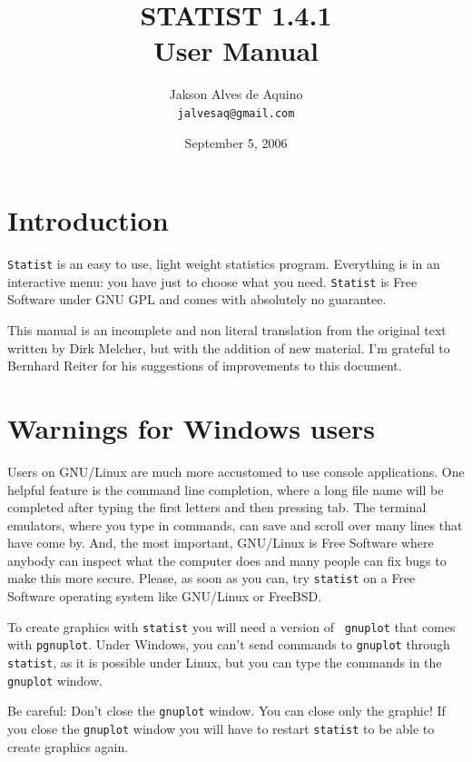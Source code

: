 \documentclass[12pt,english]{article}
\newcommand{\st}{{\tt sta\-tist} }
\begin{document}
\title{STATIST 1.4.1\\User Manual}
\author{Jakson Alves de Aquino\\
{\small {\tt jalvesaq@gmail.com}}}
\date{September 5, 2006}

\maketitle

\tableofcontents
 
\section{Introduction}

{\tt Statist} is an easy to use, light weight statistics
program.  Everything is in an interactive menu: you have
just to choose what you need. {\tt Statist} is Free Software
under GNU GPL and comes with absolutely no guarantee. 

This manual is an incomplete and non literal translation
from the original text written by Dirk Melcher, but with the
addition of new material. I'm grateful to Bernhard Reiter
for his suggestions of improvements to this document.

\section{Warnings for Windows users}

Users on GNU/Linux are much more accustomed to use console
applications.  One helpful feature is the command line
completion, where a long file name will be completed after
typing the first letters and then pressing tab.  The
terminal emulators, where you type in commands, can save and
scroll over many lines that have come by.  And, the most
important, GNU/Linux is Free Software where anybody can
inspect what the computer does and many people can fix bugs
to make this more secure.  Please, as soon as you can, try
\st on a Free Software operating system like GNU/Linux or
FreeBSD.

To create graphics with \st you will need a version of {\tt
gnuplot} that comes with {\tt pgnuplot}. Under Windows, you
can't send commands to {\tt gnuplot} through {\tt sta\-tist}, as it is
possible under Linux, but you can type the commands in the
{\tt gnuplot} window.

Be careful: Don't close the {\tt gnuplot} window.  You can
close only the graphic! If you close the {\tt gnuplot}
window you will have to restart \st to be able to create
graphics again.
\end{document}
